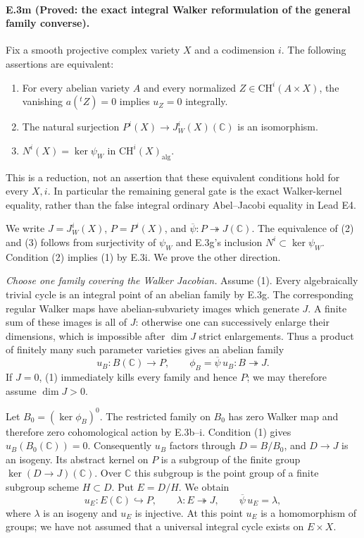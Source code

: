 \paragraph{E.3m (Proved: the exact integral Walker reformulation of the
general family converse).}
Fix a smooth projective complex variety $X$ and a codimension $i$.
The following assertions are equivalent:
\begin{enumerate}
\item For every abelian variety $A$ and every normalized
      $Z\in\mathrm{CH}^i(A\times X)$, the vanishing
      $a({}^tZ)=0$ implies $u_Z=0$ integrally.
\item The natural surjection
      $P^i(X)\to J_W^i(X)(\mathbb C)$ is an isomorphism.
\item $N^i(X)=\ker\psi_W$ in $\mathrm{CH}^i(X)_{\mathrm{alg}}$.
\end{enumerate}
This is a reduction, not an assertion that these equivalent
conditions hold for every $X,i$. In particular the remaining
general gate is the exact Walker-kernel equality, rather than
the false integral ordinary Abel--Jacobi equality in Lead E4.

We write $J=J_W^i(X)$, $P=P^i(X)$, and
$\overline\psi:P\twoheadrightarrow J(\mathbb C)$.
The equivalence of (2) and (3) follows from surjectivity of
$\psi_W$ and E.3g's inclusion $N^i\subset\ker\psi_W$.
Condition (2) implies (1) by E.3i. We prove the other direction.

\emph{Choose one family covering the Walker Jacobian.}
Assume (1). Every algebraically trivial cycle is an integral
point of an abelian family by E.3g. The corresponding regular
Walker maps have abelian-subvariety images which generate $J$.
A finite sum of these images is all of $J$: otherwise one can
successively enlarge their dimensions, which is impossible
after $\dim J$ strict enlargements. Thus a product of finitely
many such parameter varieties gives an abelian family
\[
 u_B:B(\mathbb C)\longrightarrow P,\qquad
 \phi_B=\overline\psi\,u_B:B\twoheadrightarrow J.
\]
If $J=0$, (1) immediately kills every family and hence $P$;
we may therefore assume $\dim J>0$.

Let $B_0=(\ker\phi_B)^0$. The restricted family on $B_0$
has zero Walker map and therefore zero cohomological action
by E.3b--i. Condition (1) gives $u_B(B_0(\mathbb C))=0$.
Consequently $u_B$ factors through $D=B/B_0$, and
$D\to J$ is an isogeny. Its abstract kernel on $P$ is a
subgroup of the finite group $\ker(D\to J)(\mathbb C)$.
Over $\mathbb C$ this subgroup is the point group of a finite
subgroup scheme $H\subset D$. Put $E=D/H$. We obtain
\[
 u_E:E(\mathbb C)\hookrightarrow P,
 \qquad \lambda:E\twoheadrightarrow J,
 \qquad \overline\psi\,u_E=\lambda,
\]
where $\lambda$ is an isogeny and $u_E$ is injective. At this
point $u_E$ is a homomorphism of groups; we have not assumed
that a universal integral cycle exists on $E\times X$.


